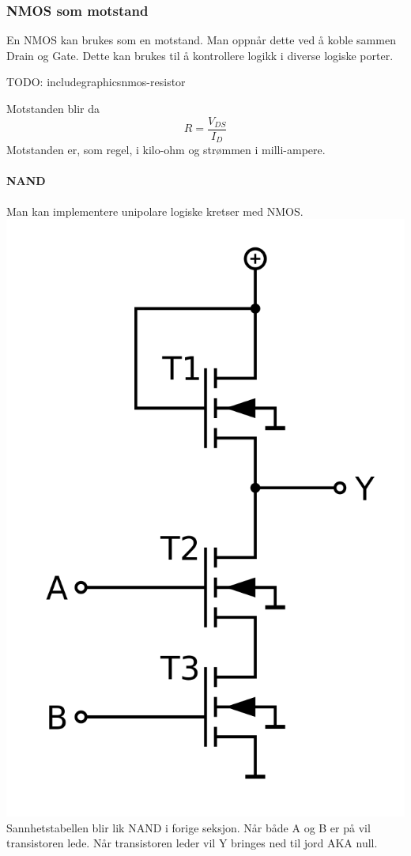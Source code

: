 \subsubsection{NMOS som motstand}
En NMOS kan brukes som en motstand.
Man oppnår dette ved å koble sammen Drain og Gate.
Dette kan brukes til å kontrollere logikk i diverse logiske porter.

TODO: includegraphics{nmos-resistor}

Motstanden blir da
$$R = \frac{V_{DS}}{I_D}$$
Motstanden er, som regel, i kilo-ohm og strømmen i milli-ampere.



\paragraph{NAND} \mbox \\
Man kan implementere unipolare logiske kretser med NMOS.
\\
\includegraphics{./img/nmos-nand}
\\
Sannhetstabellen blir lik NAND i forige seksjon.
Når både A og B er på vil transistoren lede.
Når transistoren leder vil Y bringes ned til jord AKA null.



